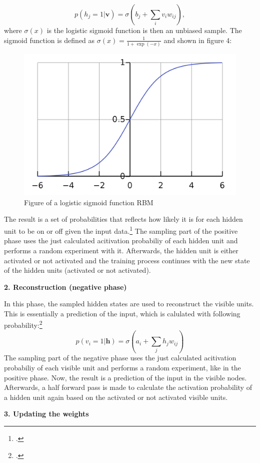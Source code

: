 \begin{equation}
p(h_j = 1 | \textbf{v}) = \sigma(b_j + \sum_i v_i w_{ij}),
\end{equation}
where $\sigma(x)$ is the logistic sigmoid function is then an unbiased sample. The sigmoid function is defined as $\sigma(x) = \frac{1}{1 + \exp(-x)}$ and shown in figure 4:
\begin{figure}[H]
    \centering
    \includegraphics[width=0.5\linewidth]{graphics/logistic_sigmoid.png}
    \caption{Figure of a logistic sigmoid function \ac{RBM}}
\end{figure}
The result is a set of probabilities that reflects how likely it is for each hidden unit to be on or off given the input data.\footcite[Vgl.][6]{huembeliPhysicsEnergybasedModels2022}
The sampling part of the positive phase uses the just calculated acitivation probabiliy of each hidden unit and performs a random experiment with it.
Afterwards, the hidden unit is either activated or not activated and the training process continues with the new state of the hidden units (activated or not activated).

\textbf{2. Reconstruction (negative phase)}

In this phase, the sampled hidden states are used to reconstruct the visible units. 
This is essentially a prediction of the input, which is calulated with following probability:\footcite[Vgl.][6]{hintonPracticalGuideTraining2012}
\begin{equation}
    p(v_i = 1 | \mathbf{h}) = \sigma(a_i + \sum_j h_j w_{ij})
\end{equation}
The sampling part of the negative phase uses the just calculated acitivation probabiliy
of each visible unit and performs a random experiment, like in the positive phase.
Now, the result is a prediction of the input in the visible nodes.
Afterwards, a half forward pass is made to calculate the activation probability of a hidden unit again based on the activated or not activated visible units.

\textbf{3. Updating the weights}

